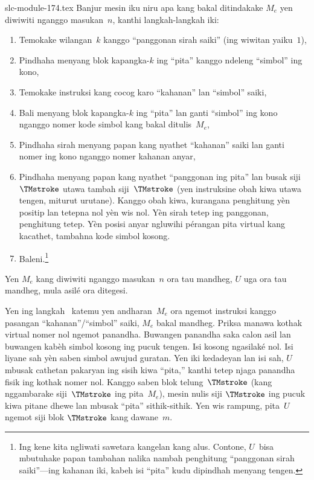 \begin{filecontents*}[overwrite]{slc-module-174.tex}
  Banjur mesin iku niru apa kang bakal ditindakake
  $M_e$ yen diwiwiti nganggo masukan~$n$, kanthi
  langkah-langkah iki:
  \begin{enumerate}
    \item Temokake wilangan~$k$ kanggo ``panggonan
    sirah saiki'' (ing wiwitan yaiku~$1$),
    \item Pindhaha menyang blok kapangka-$k$ ing
    ``pita'' kanggo ndeleng ``simbol'' ing kono,
    \item{}%
    Temokake instruksi kang cocog karo ``kahanan''
    lan ``simbol'' saiki,
    \item Bali menyang blok kapangka-$k$ ing ``pita''
    lan ganti ``simbol'' ing kono nganggo nomer
    kode simbol kang bakal ditulis~$M_e$,
    \item Pindhaha sirah menyang papan kang nyathet
    ``kahanan'' saiki lan ganti nomer ing kono
    nganggo nomer kahanan anyar,
    \item Pindhaha menyang papan kang nyathet
    ``panggonan ing pita'' lan busak
    siji~$\TMstroke$ utawa tambah siji~$\TMstroke$
    (yen instruksine obah kiwa utawa tengen,
    miturut urutane). Kanggo obah kiwa, kurangana penghitung yèn positip lan tetepna nol yèn wis nol. Yèn sirah tetep ing panggonan, penghitung tetep. Yèn posisi anyar ngluwihi pérangan pita virtual kang kacathet, tambahna kode simbol kosong.
    \item Baleni.\footnote{Ing kene kita ngliwati
    sawetara kangelan kang alus. Contone, $U$~bisa
    mbutuhake papan tambahan nalika nambah penghitung
    ``panggonan sirah saiki''---ing kahanan iki,
    kabeh isi ``pita'' kudu dipindhah menyang tengen.}
  \end{enumerate}
  Yen $M_e$ kang diwiwiti nganggo masukan~$n$
  ora tau mandheg, $U$ uga ora tau mandheg,
  mula asilé ora ditegesi.

  Yen ing langkah~ katemu yen
  andharan~$M_e$ ora ngemot instruksi kanggo
  pasangan ``kahanan''/``simbol'' saiki,
  $M_e$ bakal mandheg. Priksa manawa kothak virtual nomer nol ngemot panandha. Buwangen panandha saka calon asil lan buwangen kabèh simbol kosong ing pucuk tengen. Isi kosong ngasilaké nol. Isi liyane sah yèn saben simbol awujud guratan. Yen iki kedadeyan lan isi sah,
  $U$ mbusak cathetan pakaryan ing sisih kiwa
  ``pita,'' kanthi tetep njaga panandha fisik ing kothak nomer nol. Kanggo saben blok telung~$\TMstroke$
  (kang nggambarake siji~$\TMstroke$ ing pita~$M_e$),
  mesin nulis siji $\TMstroke$ ing pucuk kiwa
  pitane dhewe lan mbusak ``pita'' sithik-sithik.
  Yen wis rampung, pita~$U$ ngemot siji blok
  $\TMstroke$ kang dawane~$m$.
  

\end{filecontents*}
